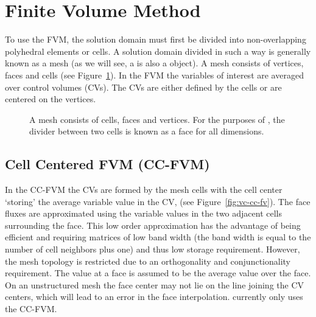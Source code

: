 \section{Finite Volume Method}

To use the FVM, the solution domain must first be divided into
non-overlapping polyhedral elements or cells.  A solution domain
divided in such a way is generally known as a mesh (as we will see, a
 is also a \FiPy{} object).  A mesh consists of vertices,
faces and cells (see Figure~\ref{fig:meshcartoon}).  In the FVM the
variables of interest are averaged over control volumes (CVs).  The
CVs are either defined by the cells or are centered on the vertices.

\begin{figure}
 \begin{center}
 \caption{A mesh consists of cells, faces and vertices. For the
 purposes of \FiPy{}, the divider between two cells is known as a face
 for all dimensions.}  \label{fig:meshcartoon} \end{center}
\end{figure}

\subsection{Cell Centered FVM (CC-FVM)}

In the CC-FVM the CVs are formed by the mesh cells with the cell
center `storing' the average variable value in the CV, (see
Figure~\ref{fig:vc-cc-fv}). The face fluxes are approximated using the
variable values in the two adjacent cells surrounding the face. This
low order approximation has the advantage of being efficient and
requiring matrices of low band width (the band width is equal to the
number of cell neighbors plus one) and thus low storage
requirement. However, the mesh topology is restricted due to an
orthogonality and conjunctionality requirement. The value at a face is
assumed to be the average value over the face. On an unstructured mesh
the face center may not lie on the line joining the CV centers, which
will lead to an error in the face interpolation. \FiPy{} currently
only uses the CC-FVM.

